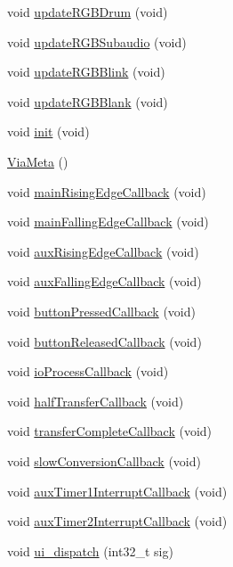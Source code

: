 \begin{DoxyCompactItemize}
\item 
void \mbox{\hyperlink{class_via_meta_af68a9b7283ccbabf24b3300310d8efea}{update\+R\+G\+B\+Drum}} (void)
\item 
void \mbox{\hyperlink{class_via_meta_a9bdd1b712bedb70d18846cc5a017d0bc}{update\+R\+G\+B\+Subaudio}} (void)
\item 
void \mbox{\hyperlink{class_via_meta_a9f5c7e4c9bc5444c463599c3654f7839}{update\+R\+G\+B\+Blink}} (void)
\item 
void \mbox{\hyperlink{class_via_meta_a18b1d7bd90f64e5e072aef3f94d1004a}{update\+R\+G\+B\+Blank}} (void)
\item 
void \mbox{\hyperlink{class_via_meta_ae4754bc3d05ef786e88b8925654b10e7}{init}} (void)
\item 
\mbox{\hyperlink{class_via_meta_af8d8701d58f2db0e2269594d15690290}{Via\+Meta}} ()
\item 
void \mbox{\hyperlink{class_via_meta_a436b5e1bdcfbbdf693cb60662f16f41c}{main\+Rising\+Edge\+Callback}} (void)
\item 
void \mbox{\hyperlink{class_via_meta_a835905663200c8d54b074dd3cd8f728a}{main\+Falling\+Edge\+Callback}} (void)
\item 
void \mbox{\hyperlink{class_via_meta_a0f19cd6bdf23ade9a83841e81d519e0c}{aux\+Rising\+Edge\+Callback}} (void)
\item 
void \mbox{\hyperlink{class_via_meta_ae3ee604199052c98b3686b05415080f1}{aux\+Falling\+Edge\+Callback}} (void)
\item 
void \mbox{\hyperlink{class_via_meta_a8788a454320240402ead3ad348a6320d}{button\+Pressed\+Callback}} (void)
\item 
void \mbox{\hyperlink{class_via_meta_aaf8a46567a601e18ec8efc333c74dbf7}{button\+Released\+Callback}} (void)
\item 
void \mbox{\hyperlink{class_via_meta_a8eac839ff146db96945e121c5805de09}{io\+Process\+Callback}} (void)
\item 
void \mbox{\hyperlink{class_via_meta_a19e5b43a5a05e814d75cb8b91e126bdd}{half\+Transfer\+Callback}} (void)
\item 
void \mbox{\hyperlink{class_via_meta_a3c6be30783cfeb8fbb2954579fd772a6}{transfer\+Complete\+Callback}} (void)
\item 
void \mbox{\hyperlink{class_via_meta_a78d563d212d841e5aa73c3207b558f05}{slow\+Conversion\+Callback}} (void)
\item 
void \mbox{\hyperlink{class_via_meta_aa11eb2d9719091cb03f50d7f4172509c}{aux\+Timer1\+Interrupt\+Callback}} (void)
\item 
void \mbox{\hyperlink{class_via_meta_aca54f9a3ca029b56887107a3bc828b0d}{aux\+Timer2\+Interrupt\+Callback}} (void)
\item 
void \mbox{\hyperlink{class_via_meta_aa1340e7f06f41cd4a0c7e69db0f7c64d}{ui\+\_\+dispatch}} (int32\+\_\+t sig)
\end{DoxyCompactItemize}
